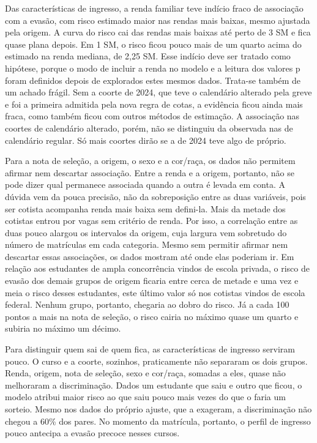 \documentclass[12pt,a4paper]{article}
\begin{document}
Das características de ingresso, a renda familiar teve indício fraco de associação com a evasão, com risco estimado maior nas rendas mais baixas, mesmo ajustada pela origem. A curva do risco cai das rendas mais baixas até perto de 3 SM e fica quase plana depois. Em 1 SM, o risco ficou pouco mais de um quarto acima do estimado na renda mediana, de 2,25 SM. Esse indício deve ser tratado como hipótese, porque o modo de incluir a renda no modelo e a leitura dos valores p foram definidos depois de explorados estes mesmos dados. Trata-se também de um achado frágil. Sem a coorte de 2024, que teve o calendário alterado pela greve e foi a primeira admitida pela nova regra de cotas, a evidência ficou ainda mais fraca, como também ficou com outros métodos de estimação. A associação nas coortes de calendário alterado, porém, não se distinguiu da observada nas de calendário regular. Só mais coortes dirão se a de 2024 teve algo de próprio.

Para a nota de seleção, a origem, o sexo e a cor/raça, os dados não permitem afirmar nem descartar associação. Entre a renda e a origem, portanto, não se pode dizer qual permanece associada quando a outra é levada em conta. A dúvida vem da pouca precisão, não da sobreposição entre as duas variáveis, pois ser cotista acompanha renda mais baixa sem defini-la. Mais da metade dos cotistas entrou por vagas sem critério de renda. Por isso, a correlação entre as duas pouco alargou os intervalos da origem, cuja largura vem sobretudo do número de matrículas em cada categoria. Mesmo sem permitir afirmar nem descartar essas associações, os dados mostram até onde elas poderiam ir. Em relação aos estudantes de ampla concorrência vindos de escola privada, o risco de evasão dos demais grupos de origem ficaria entre cerca de metade e uma vez e meia o risco desses estudantes, este último valor só nos cotistas vindos de escola federal. Nenhum grupo, portanto, chegaria ao dobro do risco. Já a cada 100 pontos a mais na nota de seleção, o risco cairia no máximo quase um quarto e subiria no máximo um décimo.

Para distinguir quem sai de quem fica, as características de ingresso serviram pouco. O curso e a coorte, sozinhos, praticamente não separaram os dois grupos. Renda, origem, nota de seleção, sexo e cor/raça, somadas a eles, quase não melhoraram a discriminação. Dados um estudante que saiu e outro que ficou, o modelo atribui maior risco ao que saiu pouco mais vezes do que o faria um sorteio. Mesmo nos dados do próprio ajuste, que a exageram, a discriminação não chegou a 60\% dos pares. No momento da matrícula, portanto, o perfil de ingresso pouco antecipa a evasão precoce nesses cursos.
\end{document}
